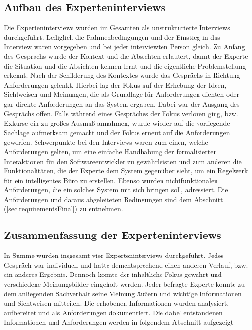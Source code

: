 \subsection{Aufbau des Experteninterviews}
    Die Experteninterviews wurden im Gesamten als unstrukturierte Interviews durchgeführt. Lediglich die Rahmenbedingungen und 
    der Einstieg in das Interview waren vorgegeben und bei jeder interviewten Person gleich. Zu Anfang des Gesprächs wurde 
    der Kontext und die Absichten erläutert, damit der Experte die Situation und die Absichten kennen lernt und die 
    eigentliche Problemstellung erkennt. Nach der Schilderung des Kontextes wurde das Gesprächs in Richtung Anforderungen 
    gelenkt. Hierbei lag der Fokus auf der Erhebung der Ideen, Sichtweisen und Meinungen, die als Grundlage für Anforderungen 
    dienten oder gar direkte Anforderungen an das System ergaben. Dabei war der Ausgang des Gesprächs offen. Falls während 
    eines Gespräches der Fokus verloren ging, bzw. Exkurse ein zu großes Ausmaß annahmen, wurde wieder auf die 
    vorliegende Sachlage aufmerksam gemacht und der Fokus erneut auf die Anforderungen geworfen. 
    Schwerpunkte bei den Interviews waren zum einen, welche Anforderungen gelten, um eine einfache Handhabung der 
    formalisierten Interaktionen für den Softwareentwickler zu gewährleisten und zum anderen die Funktionalitäten, die der 
    Experte dem System gegenüber sieht, um ein Regelwerk für ein intelligentes Büro zu erstellen. 
    Ebenso wurden nichtfunktionalen Anforderungen, die ein solches System mit sich bringen soll, adressiert. 
    Die Anforderungen und daraus abgeleiteten Bedingungen sind dem Abschnitt (\ref{sec:requirementsFinal}) zu entnehmen.
\subsection{Zusammenfassung der Experteninterviews}
    In Summe wurden insgesamt vier Experteninterviews durchgeführt. Jedes Gespräch war individuell und hatte dementsprechend 
    einen anderen Verlauf, bzw. ein anderes Ergebnis. Dennoch konnte der inhaltliche Fokus gewahrt und verschiedene 
    Meinungsbilder eingeholt werden. Jeder befragte Experte konnte zu dem anliegenden Sachverhalt seine Meinung äußern und 
    wichtige Informationen und Sichtweisen mitteilen. Die erhobenen Informationen wurden analysiert, aufbereitet und 
    als Anforderungen dokumentiert. Die dabei entstandenen Informationen und Anforderungen werden in 
    folgendem Abschnitt aufgezeigt. 
